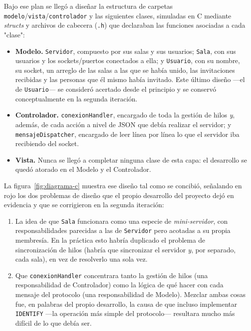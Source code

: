\documentclass[11pt,letterpaper]{article}
\begin{document}
Bajo ese plan se llegó a diseñar la estructura de carpetas
\texttt{modelo}/\texttt{vista}/\texttt{controlador} y las siguientes
clases, simuladas en C mediante \emph{structs} y archivos de cabecera
(\texttt{.h}) que declaraban las funciones asociadas a cada "clase":

\begin{itemize}
  \item \textbf{Modelo.} \texttt{Servidor}, compuesto por sus salas y sus
        usuarios; \texttt{Sala}, con sus usuarios y los sockets/puertos
        conectados a ella; y \texttt{Usuario}, con su nombre, su socket, un
        arreglo de las salas a las que se había unido, las invitaciones
        recibidas y las personas que él mismo había invitado. Este último
        diseño —el de \texttt{Usuario}— se consideró acertado desde el
        principio y se conservó conceptualmente en la segunda iteración.
  \item \textbf{Controlador.} \texttt{conexionHandler}, encargado de toda
        la gestión de hilos \emph{y}, además, de cada acción a nivel de
        JSON que debía realizar el servidor; y \texttt{mensajeDispatcher},
        encargado de leer línea por línea lo que el servidor iba
        recibiendo del socket.
  \item \textbf{Vista.} Nunca se llegó a completar ninguna clase de esta
        capa: el desarrollo se quedó atorado en el Modelo y el Controlador.
\end{itemize}

La figura~\ref{fig:diagrama-c} muestra ese diseño tal como se concibió,
señalando en rojo los dos problemas de diseño que el propio desarrollo del
proyecto dejó en evidencia y que se corrigieron en la segunda iteración:

\begin{enumerate}
  \item La idea de que \texttt{Sala} funcionara como una especie de
        \emph{mini-servidor}, con responsabilidades parecidas a las de
        \texttt{Servidor} pero acotadas a su propia membresía. En la
        práctica esto habría duplicado el problema de sincronización de
        hilos (habría que sincronizar el servidor \emph{y}, por separado,
        cada sala), en vez de resolverlo una sola vez.
  \item Que \texttt{conexionHandler} concentrara tanto la gestión de hilos
        (una responsabilidad de Controlador) como la lógica de qué hacer
        con cada mensaje del protocolo (una responsabilidad de Modelo).
        Mezclar ambas cosas fue, en palabras del propio desarrollo, la
        causa de que incluso implementar \texttt{IDENTIFY} —la operación
        más simple del protocolo— resultara mucho más difícil de lo que
        debía ser.
\end{enumerate}
\end{document}
